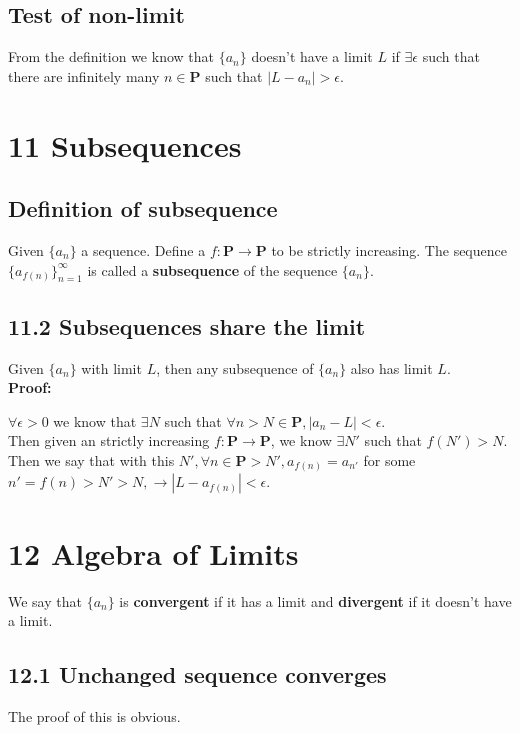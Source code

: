 \documentclass{article}
\begin{document}
\subsection*{Test of non-limit}
From the definition we know that $\{a_n\}$ doesn't have a limit $L$ if $\exists \epsilon$ such that there are infinitely many $n \in \mathbf{P}$ such that $|L - a_n| > \epsilon$.

\section*{11 Subsequences}
\subsection*{Definition of subsequence}
Given $\{a_n\}$ a sequence. Define a $f: \mathbf{P} \rightarrow \mathbf{P}$ to be strictly increasing. The sequence $\{a_{f(n)}\}_{n=1}^\infty$ is called a \textbf{subsequence} of the sequence $\{a_n\}$.
\subsection*{11.2 Subsequences share the limit}
Given $\{a_n\}$ with limit $L$, then any subsequence of $\{a_n\}$ also has limit $L$.\\
\textbf{Proof:}
\begin{addmargin}[1em]{0em}
    $\forall \epsilon > 0$ we know that $\exists N$ such that $\forall n > N \in \mathbf{P}, |a_n - L| < \epsilon$.\\
    Then given an strictly increasing $f: \mathbf{P} \rightarrow \mathbf{P}$, we know $\exists N'$ such that $f(N') > N$.\\
    Then we say that with this $N', \forall n \in \mathbf{P} > N', a_{f(n)} = a_{n'}$ for some $n' = f(n) > N' > N, \rightarrow |L - a_{f(n)}| < \epsilon$.
\end{addmargin}

\section*{12 Algebra of Limits}
We say that $\{a_n\}$ is \textbf{convergent} if it has a limit and \textbf{divergent} if it doesn't have a limit.
\subsection*{12.1 Unchanged sequence converges}
The proof of this is obvious.
\end{document}
